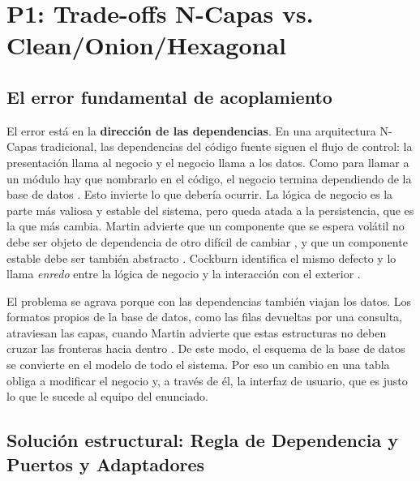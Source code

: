 
\chapter{P1: Trade-offs N-Capas vs. Clean/Onion/Hexagonal}

\section{El error fundamental de acoplamiento}

El error está en la \textbf{dirección de las dependencias}. En una arquitectura N-Capas tradicional, las dependencias del código fuente siguen el flujo de control: la presentación llama al negocio y el negocio llama a los datos. Como para llamar a un módulo hay que nombrarlo en el código, el negocio termina dependiendo de la base de datos \citep[pp.~44--45]{martin2017}. Esto invierte lo que debería ocurrir. La lógica de negocio es la parte más valiosa y estable del sistema, pero queda atada a la persistencia, que es la que más cambia. Martin advierte que un componente que se espera volátil no debe ser objeto de dependencia de otro difícil de cambiar , y que un componente estable debe ser también abstracto . Cockburn identifica el mismo defecto y lo llama \emph{enredo} entre la lógica de negocio y la interacción con el exterior \citep[«Nature of the Solution»]{cockburn2005}.

El problema se agrava porque con las dependencias también viajan los datos. Los formatos propios de la base de datos, como las filas devueltas por una consulta, atraviesan las capas, cuando Martin advierte que estas estructuras no deben cruzar las fronteras hacia dentro \citep[pp.~204, 207]{martin2017}. De este modo, el esquema de la base de datos se convierte en el modelo de todo el sistema. Por eso un cambio en una tabla obliga a modificar el negocio y, a través de él, la interfaz de usuario, que es justo lo que le sucede al equipo del enunciado.

\section{Solución estructural: Regla de Dependencia y Puertos y Adaptadores}

